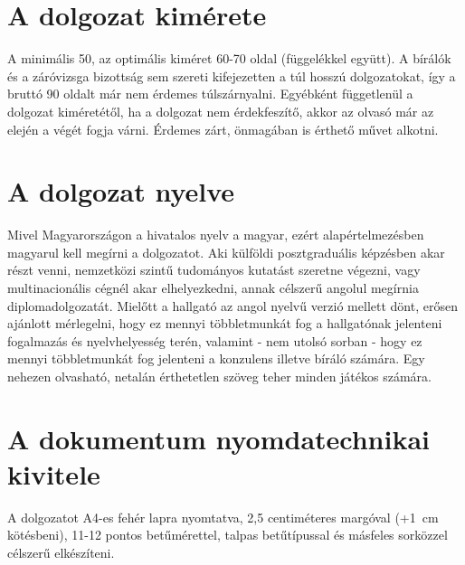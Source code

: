 \section{A dolgozat kimérete}
A minimális 50, az optimális kiméret 60-70 oldal (függelékkel együtt). A bírálók és a záróvizsga bizottság sem szereti kifejezetten a túl hosszú dolgozatokat, így a bruttó 90 oldalt már nem érdemes túlszárnyalni. Egyébként függetlenül a dolgozat kiméretétől, ha a dolgozat nem érdekfeszítő, akkor az olvasó már az elején a végét fogja várni. Érdemes zárt, önmagában is érthető művet alkotni.

\section{A dolgozat nyelve}
Mivel Magyarországon a hivatalos nyelv a magyar, ezért alapértelmezésben magyarul kell megírni a dolgozatot. Aki külföldi posztgraduális képzésben akar részt venni, nemzetközi szintű tudományos kutatást szeretne végezni, vagy multinacionális cégnél akar elhelyezkedni, annak célszerű angolul megírnia diplomadolgozatát. Mielőtt a hallgató az angol nyelvű verzió mellett dönt, erősen ajánlott mérlegelni, hogy ez mennyi többletmunkát fog a hallgatónak jelenteni fogalmazás és nyelvhelyesség terén, valamint - nem utolsó sorban - hogy ez mennyi többletmunkát fog jelenteni a konzulens illetve bíráló számára. Egy nehezen olvasható, netalán érthetetlen szöveg teher minden játékos számára.

\section{A dokumentum nyomdatechnikai kivitele}
A dolgozatot A4-es fehér lapra nyomtatva, 2,5 centiméteres margóval (+1~cm kötésbeni), 11-12 pontos betűmérettel, talpas betűtípussal és másfeles sorközzel célszerű elkészíteni.


